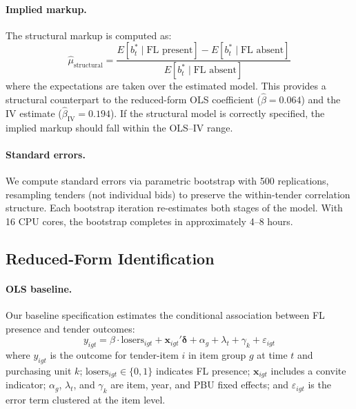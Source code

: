 \paragraph{Implied markup.}
The structural markup is computed as:
\begin{equation}
  \hat{\mu}_{\text{structural}} =
  \frac{E[b^*_t \mid \text{FL present}] -
        E[b^*_t \mid \text{FL absent}]}{E[b^*_t \mid \text{FL absent}]}
  \label{eq:structural_markup}
\end{equation}
where the expectations are taken over the estimated model. This provides
a structural counterpart to the reduced-form OLS coefficient
($\hat{\beta} = 0.064$) and the IV estimate ($\hat{\beta}_{\text{IV}} =
0.194$). If the structural model is correctly specified, the implied
markup should fall within the OLS--IV range.

\paragraph{Standard errors.}
We compute standard errors via parametric bootstrap with 500
replications, resampling tenders (not individual bids) to preserve the
within-tender correlation structure. Each bootstrap iteration
re-estimates both stages of the model. With 16 CPU cores, the bootstrap
completes in approximately 4--8 hours. %


\subsection{Reduced-Form Identification}
\label{sec:reduced_form}

\paragraph{OLS baseline.}
Our baseline specification estimates the conditional association between
FL presence and tender outcomes:
\begin{equation}
  y_{igt} = \beta \cdot \text{losers}_{igt} + \mathbf{x}_{igt}'
  \boldsymbol{\delta} + \alpha_g + \lambda_t + \gamma_k + \varepsilon_{igt}
  \label{eq:ols_main}
\end{equation}
where $y_{igt}$ is the outcome for tender-item $i$ in item group $g$ at
time $t$ and purchasing unit $k$; $\text{losers}_{igt} \in \{0,1\}$
indicates FL presence; $\mathbf{x}_{igt}$ includes a convite indicator;
$\alpha_g$, $\lambda_t$, and $\gamma_k$ are item, year, and PBU fixed
effects; and $\varepsilon_{igt}$ is the error term clustered at the item
level.

